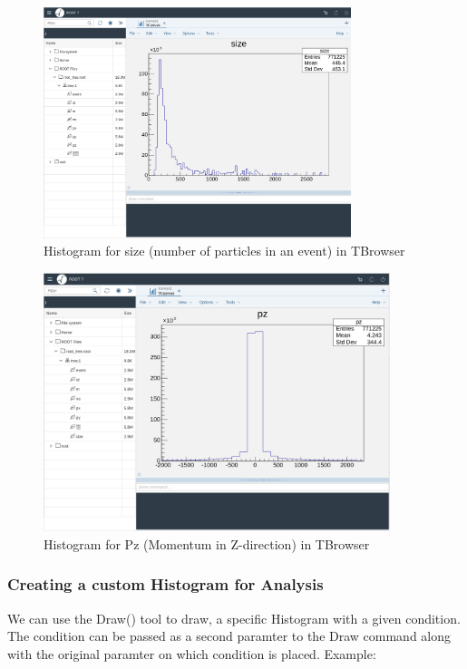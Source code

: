 \documentclass[letterpaper,12pt]{article}
\begin{document}
\begin{spacing}{1.125}
\begin{figure}[!htb]
  \includegraphics[width=0.8\textwidth]{size-hist.png}
  \caption{Histogram for size (number of particles in an event) in TBrowser}
  \label{size-hist}
\end{figure}

\begin{figure}[!htb]
  \includegraphics[width=0.9\textwidth]{pz-hist.png}
  \caption{Histogram for Pz (Momentum in Z-direction) in TBrowser}
  \label{pz-hist}
\end{figure}


\subsubsection{Creating a custom Histogram for Analysis}

We can use the Draw() tool to draw, a specific Histogram with a given
condition. The condition can be passed as a second paramter to the Draw command
along with the original paramter on which condition is placed. Example:



\end{spacing}
\end{document}
